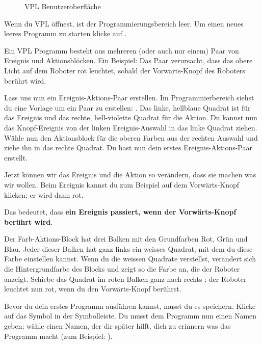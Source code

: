 \begin{figure}[hbt]
\caption{VPL Benutzeroberfläche}\label{fig.gui}
\end{figure}



Wenn du VPL öffnest, ist der Programmierungsbereich leer. Um einen neues leeres
Programm zu starten klicke auf .

Ein VPL Programm besteht aus mehreren (oder auch nur einem) Paar von Ereignis
und Aktionsblöcken. Ein Beispiel: Das Paar  verursacht, dass das
obere Licht auf dem Roboter rot leuchtet, sobald der Vorwärts-Knopf des
Roboters berührt wird.


Lass uns nun ein Ereignis-Aktions-Paar erstellen. Im Programmierbereich siehst
du eine Vorlage um ein Paar zu erstellen: . Das
linke, hellblaue Quadrat ist für das Ereignis und das rechte, hell-violette
Quadrat für die Aktion. Du kannst nun das Knopf-Ereignis 
von der linken Ereignis-Auswahl in das linke Quadrat ziehen. Wähle nun den
Aktionsblock für die oberen Farben  aus der rechten
Auswahl und ziehe ihn in das rechte Quadrat. Du hast nun dein erstes
Ereignis-Aktions-Paar erstellt.

Jetzt können wir das Ereignis und die Aktion so verändern, dass sie machen was
wir wollen. Beim Ereignis kannst du zum Beispiel auf dem Vorwärts-Knopf
klicken; er wird dann rot.

Das bedeutet, dass \textbf{ein Ereignis passiert, wenn der Vorwärts-Knopf
berührt wird}.

Der Farb-Aktions-Block hat drei Balken mit den Grundfarben Rot, Grün und Blau.
Jeder dieser Balken hat ganz links ein weisses Quadrat, mit dem du diese Farbe
einstellen kannst. Wenn du die weissen Quadrate verstellst, verändert sich die
Hintergrundfarbe des Blocks und zeigt so die Farbe an, die der Roboter anzeigt.
Schiebe das Quadrat im roten Balken ganz nach rechts ; der Roboter
leuchtet nun rot, wenn du den Vorwärts-Knopf berührst. 


Bevor du dein erstes Programm ausführen kannst, musst du es speichern. Klicke
auf das Symbol  in der Symbolleiste. Du musst dem Programm nun
einen Namen geben; wähle einen Namen, der dir später hilft, dich zu erinnern
was das Programm macht (zum Beispiel: ).


